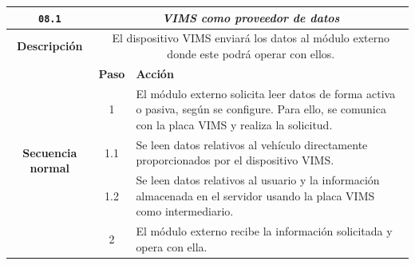 \begin{table}[H]
  \centering
  \begin{tabularx}{\textwidth}{|c|c|X|}
    \hline
    \texttt{08.1}                               & \multicolumn{2}{c|}{\textit{\ac{VIMS} como proveedor de datos}}                                                                                                                                                                                                                                       \\
    \hline
    \textbf{Descripción}                        & \multicolumn{2}{X|}{El dispositivo \ac{VIMS} enviará los datos al módulo externo donde este podrá operar con ellos.}                                                                                                                                                                                  \\
    \hline
    \multirow{11}{*}{\textbf{Secuencia normal}} & \textbf{Paso}                                                                                                        & \textbf{Acción}                                                                                                                                                                \\
    \cline{2-3}
                                                & 1                                                                                                                    & \multicolumn{1}{L|}{El módulo externo solicita leer datos de forma activa o pasiva, según se configure. Para ello, se comunica con la placa \ac{VIMS} y realiza la solicitud.} \\
    \cline{2-3}
                                                & 1.1                                                                                                                  & \multicolumn{1}{L|}{Se leen datos relativos al vehículo directamente proporcionados por el dispositivo \ac{VIMS}.}                                                             \\
    \cline{2-3}
                                                & 1.2                                                                                                                  & \multicolumn{1}{L|}{Se leen datos relativos al usuario y la información almacenada en el servidor usando la placa \ac{VIMS} como intermediario.}                               \\
    \cline{2-3}
                                                & 2                                                                                                                    & \multicolumn{1}{L|}{El módulo externo recibe la información solicitada y opera con ella.}                                                                                      \\

\end{tabularx}
\end{table}

